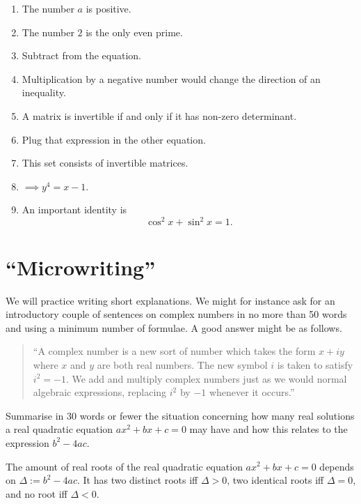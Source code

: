 \documentclass{UoESoMworkshop}
\begin{document}
\begin{enumerate}
\item The number $a$ is positive.
\item The number $2$ is the only even prime.
\item Subtract from the equation.
\item Multiplication by a negative number would change the direction of an inequality.
\item A matrix is invertible if and only if it has non-zero determinant.
\item Plug that expression in the other equation.
\item This set consists of invertible matrices. 
\item $\implies y^4=x−1$.
\item An important identity is \[ \cos^2x + \sin^2x = 1.\]
\end{enumerate}



\section{``Microwriting''}
We will practice writing short explanations. We might for instance ask for an 
introductory couple of sentences on complex numbers in no more than 50 words 
and using a minimum number of formulae. A good answer might be as follows. 

\begin{quote}
``A complex number is a new sort of number which takes the form $x+iy$ where $x$ and $y$ are both real numbers. 
The new symbol $i$ is taken to satisfy $i^2=-1$. We add and multiply complex 
numbers just as we would normal algebraic expressions, replacing $i^2$ by $-1$ whenever it occurs.'' 
\end{quote}

\begin{exercise}[20 min]
Summarise in 30 words or fewer the situation concerning how many real solutions a 
real quadratic equation \( ax^2+bx+c=0 \) may have and how this relates to the expression \( b^2-4ac \). 
\end{exercise}

The amount of real roots of the real quadratic equation $ax^2+bx+c=0$ depends on $\Delta:=b^2-4ac$. It has two distinct roots iff $\Delta>0$, two identical roots  iff $\Delta=0$, and no root iff $\Delta<0$.
\end{document}

